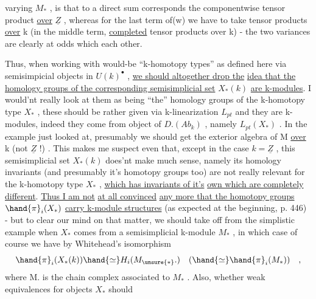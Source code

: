 
varying $M_{*}$ , is that to a direct sum corresponds the componentwise
tensor product \uline{over} $\underline{Z}$ , whereas for the last term of(w) we have to take
tensor products \uline{over} k (in the middle term, \uline{completed} tensor products
over k) - the two variances are clearly at odds which each other.

Thus, when working with would-be ``k-homotopy types'' as defined
here via semisimpicial objects in $U(k)^{\bullet}$ , \uline{we should altogether drop the}
\uline{idea that the homology groups of the corresponding semisimplicial set}
$X_{*}(k)$ \uline{are k-modules}. I would'nt really look at them as being ``the''
homology groups of the k-homotopy type $X_{*}$ , these should be rather given
via k-linearization  $L_{pt}$ and they are k-modules, indeed they come
from   object of $D.(Ab_{k})$ , namely $L_{pt}(X_{*})$ . In the example just
looked at, presumably we should get the exterior algebra of M \uline{over} k
(not $\underline{Z}$ !) . This makes me suspect even that, except in the case $k=\underline{Z}$ ,
this semisimplicial set $X_{*}(k)$ does'nt make much sense, namely its
homology invariants (and presumably it's homotopy groups too) are not
really relevant for the k-homotopy type $X_{*}$ , \uline{which has invariants of it's}
\uline{own which are completely different}. \uline{Thus I am not}  \uline{at all convinced}
 \uline{any more that the homotopy groups} $\hand{\pi}_{i}(X_{*})$ \uline{carry k-module structures} (as
expected at the beginning, p. 446) - but to clear our mind on that
matter, we should take off from the simplistic example when $X_{*}$ comes
from a semisimplicial k-module $M_{*}$ , in which case of course we have by
Whitehead's isomorphism
\[ \hand{\pi}_{i}(X_{*}(k)) \hand{\simeq} H_{i}(M_{\unsure{*}}.) \quad ( \hand{\simeq} \hand{\pi}_{i}(M_{*})) \quad , \]
where M. is the chain complex associated to $M_{*}$ . Also, 
  whether weak equivalences  for objects $X_{*}$ should
